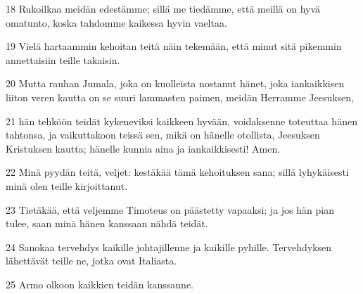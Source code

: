 \par 18 Rukoilkaa meidän edestämme; sillä me tiedämme, että meillä on hyvä omatunto, koska tahdomme kaikessa hyvin vaeltaa.
\par 19 Vielä hartaammin kehoitan teitä näin tekemään, että minut sitä pikemmin annettaisiin teille takaisin.
\par 20 Mutta rauhan Jumala, joka on kuolleista nostanut hänet, joka iankaikkisen liiton veren kautta on se suuri lammasten paimen, meidän Herramme Jeesuksen,
\par 21 hän tehköön teidät kykeneviksi kaikkeen hyvään, voidaksenne toteuttaa hänen tahtonsa, ja vaikuttakoon teissä sen, mikä on hänelle otollista, Jeesuksen Kristuksen kautta; hänelle kunnia aina ja iankaikkisesti! Amen.
\par 22 Minä pyydän teitä, veljet: kestäkää tämä kehoituksen sana; sillä lyhykäisesti minä olen teille kirjoittanut.
\par 23 Tietäkää, että veljemme Timoteus on päästetty vapaaksi; ja jos hän pian tulee, saan minä hänen kanssaan nähdä teidät.
\par 24 Sanokaa tervehdys kaikille johtajillenne ja kaikille pyhille. Tervehdyksen lähettävät teille ne, jotka ovat Italiasta.
\par 25 Armo olkoon kaikkien teidän kanssanne.


